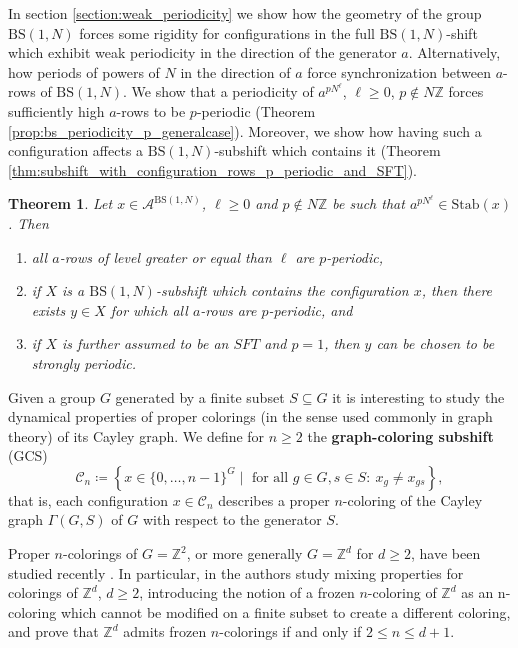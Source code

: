 \documentclass{aims}
\newcommand{\BS}[1][N]{\mathrm{BS}(1,#1)}
\newtheorem{theorem}{Theorem}[section]
\theoremstyle{definition}
\begin{document}
In section \ref{section:weak_periodicity} we show how the geometry of the group $\BS$ forces some rigidity for configurations in the full $\BS$-shift which exhibit weak periodicity in the direction of the generator $a$. Alternatively, how periods of powers of $N$ in the direction of $a$ force synchronization between $a$-rows of $\BS$. We show that a periodicity of $a^{pN^\ell}$, $\ell\ge 0$, $p\notin N\mathbb{Z}$ forces sufficiently high $a$-rows to be $p$-periodic (Theorem \ref{prop:bs_periodicity_p_generalcase}). Moreover, we show how having such a configuration affects a $\BS$-subshift which contains it (Theorem \ref{thm:subshift_with_configuration_rows_p_periodic_and_SFT}).

\begin{theorem}\label{thm:summary_weak_periodicity}
	Let $x\in \mathcal{A}^{\BS}$, $\ell\ge 0$ and $p\notin N\mathbb{Z}$ be such that $a^{pN^{\ell}}\in \mathrm{Stab}(x)$. Then
	\begin{enumerate}
		\item all $a$-rows of level greater or equal than $\ell$ are $p$-periodic,
		\item if $X$ is a $\BS$-subshift which contains the configuration $x$, then there exists $y\in X$ for which all $a$-rows are $p$-periodic, and 
		\item if $X$ is further assumed to be an $SFT$ and $p=1$, then $y$ can be chosen to be strongly periodic.
	\end{enumerate}
\end{theorem}

Given a group $G$ generated by a finite subset $S\subseteq G$ it is interesting to study the dynamical properties of proper colorings (in the sense used commonly in graph theory) of its Cayley graph. We define for $n\ge 2$ the \textbf{graph-coloring subshift} (GCS)
$$
\mathcal{C}_{n}\coloneqq\left\{x\in \{0,\ldots,n-1\}^G\mid \text{ for all } g\in G, s\in S: \ x_{g}\neq x_{gs} \right\},
$$
that is, each configuration $x\in \mathcal{C}_{n}$ describes a proper $n$-coloring of the Cayley graph $\Gamma(G,S)$ of $G$ with respect to the generator $S$. 

Proper $n$-colorings of $G=\mathbb{Z}^2$, or more generally $G=\mathbb{Z}^d$ for $d\ge 2$, have been studied recently \cite{alon2019mixing, peled2018rigidity, ray2020proper}. In particular, in \cite{alon2019mixing} the authors study mixing properties for colorings of $\mathbb{Z}^d$, $d\ge 2$, introducing the notion of a frozen $n$-coloring of $\mathbb{Z}^d$ as an n-coloring which cannot be modified on a finite subset to create a different coloring, and prove that $\mathbb{Z}^d$ admits frozen $n$-colorings if and only if $2\le n\le d+1$. 
\end{document}
